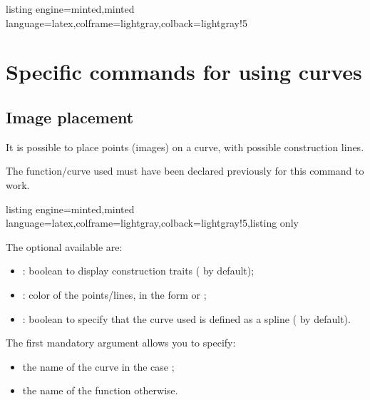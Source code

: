 \documentclass[11pt,a4paper]{ltxdoc}
\begin{document}
\begin{tcblisting}{listing engine=minted,minted language=latex,colframe=lightgray,colback=lightgray!5}
\begin{GraphTikz}[x=1cm,y=1cm,Xmin=0,Xmax=5,Ymin=0,Ymax=1]
\end{GraphTikz}
\end{tcblisting}

\section{Specific commands for using curves}

\subsection{Image placement}\label{images}

It is possible to place points (images) on a curve, with possible construction lines.

The function/curve used must have been declared previously for this command to work.

\begin{tcblisting}{listing engine=minted,minted language=latex,colframe=lightgray,colback=lightgray!5,listing only}
\end{tcblisting}

The optional \MontreCode{[keys]} available are:

\smallskip

\begin{itemize}
	\item {}: boolean to display construction traits ( by default);
	\item {}: color of the points/lines, in the form  or ;
	\item {}: boolean to specify that the curve used is defined as a \textsf{spline} ( by default).
\end{itemize}

\smallskip

The first mandatory argument allows you to specify:

\smallskip

\begin{itemize}
	\item the name of the curve in the case ;
	\item the name of the function otherwise.
\end{itemize}
\end{document}

